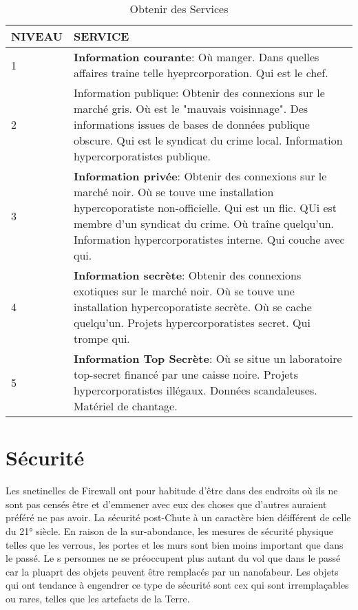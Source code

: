\begin{table} \caption{Obtenir des Services} \begin{tabularx}{\textwidth}{|l|X|} \hline

NIVEAU &SERVICE \\ \hline

1 &\textbf{Information courante}: Où manger. Dans quelles affaires traine telle hyeprcorporation. Qui est le chef. \\ \hline

2 &Information publique: Obtenir des connexions sur le marché gris. Où est le "mauvais voisinnage". Des informations issues de bases de données publique obscure. Qui est le syndicat du crime local. Information hypercorporatistes publique. \\ \hline

3 &\textbf{Information privée}: Obtenir des connexions sur le marché noir. Où se touve une installation hypercoporatiste non-officielle. Qui est un flic. QUi est membre d'un syndicat du crime. Où traîne quelqu'un. Information hypercorporatistes interne. Qui couche avec qui. \\ \hline

4 &\textbf{Information secrète}: Obtenir des connexions exotiques sur le marché noir. Où se touve une installation hypercoporatiste secrète. Où se cache quelqu'un. Projets hypercorporatistes secret. Qui trompe qui. \\ \hline

5 &\textbf{Information Top Secrète}: Où se situe un laboratoire top-secret financé par une caisse noire. Projets hypercorporatistes illégaux. Données scandaleuses. Matériel de chantage. \\ \hline

\end{tabularx} \end{table} 







\section{Sécurité} 

Les snetinelles de Firewall ont pour habitude d'être dans des endroits où ils ne sont pas censés être et d'emmener avec eux des choses que d'autres auraient préféré ne pas avoir. La sécurité post-Chute à un caractère bien déifférent de celle du 21° siècle. En raison de la sur-abondance, les mesures de sécurité physique telles que les verrous, les portes et les murs sont bien moins important que dans le passé. Le s personnes ne se préoccupent plus autant du vol que dans le passé car la pluaprt des objets peuvent être remplacés par un nanofabeur. Les objets qui ont tendance à engendrer ce type de sécurité sont cex qui sont irremplaçables ou rares, telles que les artefacts de la Terre. 

